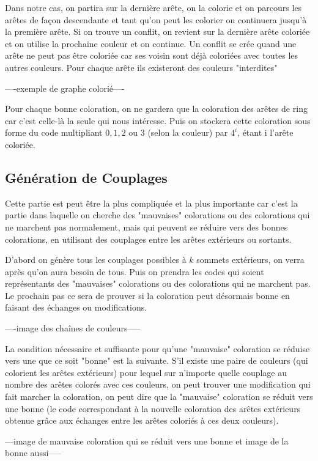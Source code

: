 \documentclass[10pt,a4paper]{article}
\begin{document}
Dans notre cas, on partira sur la dernière arête, on la colorie et on parcours les arêtes de façon descendante et tant qu'on peut les colorier on continuera jusqu'à la première arête. Si on trouve un conflit, on revient sur la dernière arête coloriée et on utilise la prochaine couleur et on continue. Un conflit se crée quand une arête ne peut pas être coloriée car ses voisin sont déjà coloriées avec toutes les autres couleurs. Pour chaque arête ils existeront des couleurs "interdites" 

----exemple de graphe colorié----

Pour chaque bonne coloration, on ne gardera que la coloration des arêtes de ring car c'est celle-là la seule qui nous intéresse. Puis on stockera cette coloration sous forme du code multipliant $0,1,2$ ou $3$ (selon la couleur) par $4^{i}$, étant i l'arête coloriée.
\subsection{Génération de Couplages}

Cette partie est peut être la plus compliquée et la plus importante car c'est la partie dans laquelle on cherche des "mauvaises" colorations ou des colorations qui ne marchent pas normalement, mais qui peuvent se réduire vers des bonnes colorations, en utilisant des couplages entre les arêtes extérieurs ou sortants. 

D'abord on génère tous les couplages possibles à $k$ sommets extérieurs, on verra après qu'on aura besoin de tous. Puis on prendra les codes qui soient représentants des "mauvaises" colorations ou des colorations qui ne marchent pas. Le prochain pas ce sera de prouver si la coloration peut désormais bonne en faisant des échanges ou modifications. 

----image des chaînes de couleurs-----

La condition nécessaire et suffisante pour qu'une "mauvaise" coloration se réduise vers une que ce soit "bonne" est la suivante. S'il existe une paire de couleurs (qui colorient les arêtes extérieurs) pour lequel sur n'importe quelle couplage au nombre des arêtes colorés avec ces couleurs, on peut trouver une modification qui fait marcher la coloration, on peut dire que la "mauvaise" coloration se réduit vers une bonne (le code correspondant à la nouvelle coloration des arêtes extérieurs obtenue grâce aux échanges entre les arêtes coloriés à ces deux couleurs).

---image de mauvaise coloration qui se réduit vers une bonne et image de la bonne aussi-----
\end{document}
